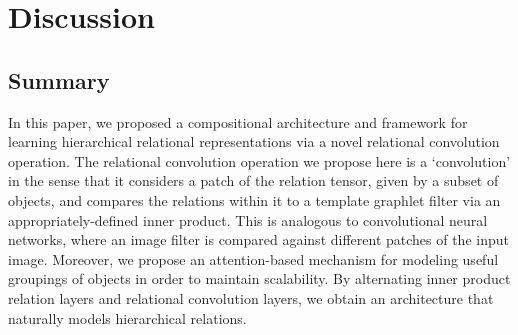 
\section{Discussion}\label{sec:discussion}
\subsection*{Summary}
In this paper, we proposed a compositional architecture and framework for learning hierarchical relational representations via a novel relational convolution operation. The relational convolution operation we propose here is a `convolution' in the sense that it considers a patch of the relation tensor, given by a subset of objects, and compares the relations within it to a template graphlet filter via an appropriately-defined inner product. This is analogous to convolutional neural networks, where an image filter is compared against different patches of the input image. Moreover, we propose an attention-based mechanism for modeling useful groupings of objects in order to maintain scalability. By alternating inner product relation layers and relational convolution layers, we obtain an architecture that naturally models hierarchical relations.



